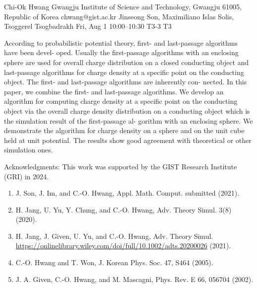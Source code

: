 \begin{talk}
  {Chi-Ok Hwang}%
  {Gwangju Institute of Science and Technology, Gwangju 61005, Republic of Korea}%
  {chwang@gist.ac.kr}%
  {Jinseong Son, Maximiliano Islas Solis, Tsoggerel Tsogbadrakh}%
  {}%
  {}%
  {Fri, Aug 1 10:00--10:30}%
  {T3-3}%
  {T3}%
  
    
   
According to probabilistic potential theory, first- and last-passage algorithms have been devel-
oped. Usually the first-passage algorithms with an enclosing sphere are used for overall charge
distribution on a closed conducting object and last-passage algorithms for charge density at a
specific point on the conducting object. The first- and last-passage algorithms are inherently con-
nected. In this paper, we combine the first- and last-passage algorithms. We develop an algorithm
for computing charge density at a specific point on the conducting object via the overall charge
density distribution on a conducting object which is the simulation result of the first-passage al-
gorithm with an enclosing sphere. We demonstrate the algorithm for charge density on a sphere
and on the unit cube held at unit potential. The results show good agreement with theoretical or
other simulation ones.


\medskip

Acknowledgments: This work was supported by the GIST Research Institute (GRI) in 2024.
\begin{enumerate}
 \item[{[1]}] J. Son, J. Im, and C.-O. Hwang, Appl. Math. Comput. submitted (2021).
 \item[{[2]}] H. Jang, U. Yu, Y. Chung, and C.-O. Hwang, Adv. Theory Simul. 3(8) (2020).
  \item[{[3]}] H. Jang, J. Given, U. Yu, and C.-O. Hwang, Adv. Theory Simul.\hfill\break
   \href{https://onlinelibrary.wiley.com/doi/full/10.1002/adts.202000268}{https://onlinelibrary.wiley.com/doi/full/10.1002/adts.20200026} (2021).
 \item[{[4]}] C.-O. Hwang and T. Won, J. Korean Phys. Soc. 47, S464 (2005).
 \item[{[5]}] J. A. Given, C.-O. Hwang, and M. Mascagni, Phys. Rev. E 66, 056704 (2002).
\end{enumerate}


\end{talk}

